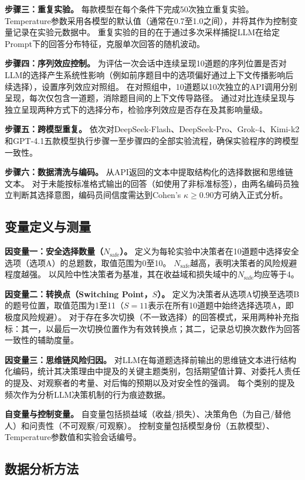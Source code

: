 \documentclass[journal]{vgtc}
\begin{document}
\textbf{步骤三：重复实验。}
每款模型在每个条件下完成50次独立重复实验。
Temperature参数采用各模型的默认值（通常在0.7至1.0之间），并将其作为控制变量记录在实验元数据中。
重复实验的目的在于通过多次采样捕捉LLM在给定Prompt下的回答分布特征，克服单次回答的随机波动。

\textbf{步骤四：序列效应控制。}
为评估一次会话中连续呈现10道题的序列位置是否对LLM的选择产生系统性影响（例如前序题目中的选项偏好通过上下文传播影响后续选择），设置序列效应对照组。
在对照组中，10道题以10次独立的API调用分别呈现，每次仅包含一道题，消除题目间的上下文传导路径。
通过对比连续呈现与独立呈现两种方式下的选择分布，检验序列效应是否存在及其影响量级。

\textbf{步骤五：跨模型重复。}
依次对DeepSeek-Flash、DeepSeek-Pro、Grok-4、Kimi-k2和GPT-4.1五款模型执行步骤一至步骤四的全部实验流程，确保实验程序的跨模型一致性。

\textbf{步骤六：数据清洗与编码。}
从API返回的文本中提取结构化的选择数据和思维链文本。
对于未能按标准格式输出的回答（如使用了非标准标签），由两名编码员独立判断其选择意图，编码员间信度需达到Cohen's $\kappa \geq 0.90$方可纳入正式分析。

\subsection{变量定义与测量}

\textbf{因变量一：安全选择数量（$N_{\text{safe}}$）。}
定义为每轮实验中决策者在10道题中选择安全选项（选项A）的总题数，取值范围为0至10。
$N_{\text{safe}}$越高，表明决策者的风险规避程度越强。
以风险中性决策者为基准，其在收益域和损失域中的$N_{\text{safe}}$均应等于4。

\textbf{因变量二：转换点（Switching Point，$S$）。}
定义为决策者从选项A切换至选项B的题号位置，取值范围为1至11（$S = 11$表示在所有10道题中始终选择选项A，即极度风险规避）。
对于存在多次切换（不一致选择）的回答模式，采用两种补充指标：其一，以最后一次切换位置作为有效转换点；其二，记录总切换次数作为回答一致性的辅助度量。

\textbf{因变量三：思维链风险归因。}
对LLM在每道题选择前输出的思维链文本进行结构化编码，统计其决策理由中提及的关键主题类别，包括期望值计算、对委托人责任的提及、对观察者的考量、对后悔的预期以及对安全性的强调。
每个类别的提及频次作为分析LLM决策机制的行为痕迹数据。

\textbf{自变量与控制变量。}
自变量包括损益域（收益/损失）、决策角色（为自己/替他人）和问责性（不可观察/可观察）。
控制变量包括模型身份（五款模型）、Temperature参数值和实验会话编号。

\subsection{数据分析方法}
\end{document}
